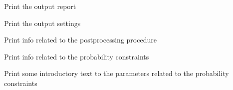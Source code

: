 \documentclass[letterpaper,10pt,english]{sphinxmanual}
\begin{document}
\begin{fulllineitems}
\begin{fulllineitems}
\end{fulllineitems}


\begin{fulllineitems}
\label{\detokenize{appendices:s2Dcd.deesse.Param.print_out_report}}
Print the output report

\end{fulllineitems}


\begin{fulllineitems}
\label{\detokenize{appendices:s2Dcd.deesse.Param.print_out_set}}
Print the output settings

\end{fulllineitems}


\begin{fulllineitems}
\label{\detokenize{appendices:s2Dcd.deesse.Param.print_post}}
Print info related to the post\sphinxhyphen{}processing procedure

\end{fulllineitems}


\begin{fulllineitems}
\label{\detokenize{appendices:s2Dcd.deesse.Param.print_proconst}}
Print info related to the probability constraints

\end{fulllineitems}


\begin{fulllineitems}
\label{\detokenize{appendices:s2Dcd.deesse.Param.print_proconst_intro}}
Print some introductory text to the 
parameters related to the probability constraints


\end{fulllineitems}
\end{fulllineitems}
\end{document}
